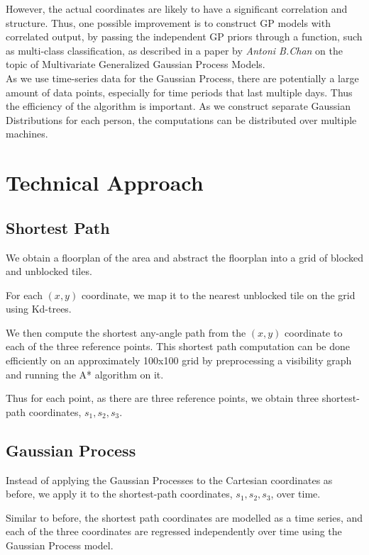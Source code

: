 \documentclass[letterpaper]{article}
\begin{document}
However, the actual coordinates are likely to have a significant correlation and structure. Thus, one possible improvement is to construct GP models with correlated output, by passing the independent GP priors through a function, such as multi-class classification, as described in a paper by {\it Antoni B.Chan} on the topic of Multivariate Generalized Gaussian Process Models. \\

As we use time-series data for the Gaussian Process, there are potentially a large amount of data points, especially for time periods that last multiple days. Thus the efficiency of the algorithm is important. As we construct separate Gaussian Distributions for each person, the computations can be distributed over multiple machines.


\section{Technical Approach}



\subsection{Shortest Path}

We obtain a floorplan of the area and abstract the floorplan into a grid of blocked and unblocked tiles.

For each $(x,y)$ coordinate, we map it to the nearest unblocked tile on the grid using Kd-trees.

We then compute the shortest any-angle path from the $(x,y)$ coordinate to each of the three reference points. This shortest path computation can be done efficiently on an approximately 100x100 grid by preprocessing a visibility graph and running the A* algorithm on it.

Thus for each point, as there are three reference points, we obtain three shortest-path coordinates, $s_1, s_2, s_3$.

\subsection{Gaussian Process}

Instead of applying the Gaussian Processes to the Cartesian coordinates as before, we apply it to the shortest-path coordinates, $s_1, s_2, s_3$, over time.

Similar to before, the shortest path coordinates are modelled as a time series, and each of the three coordinates are regressed independently over time using the Gaussian Process model.
\end{document}
